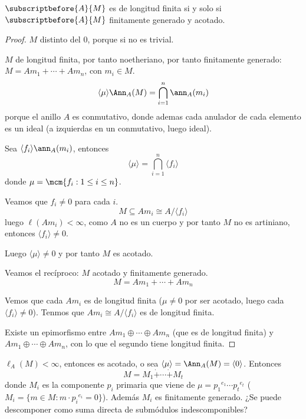 \begin{lema}
  \(\subscriptbefore{A}{M}\) es de longitud finita si y solo si
  \(\subscriptbefore{A}{M}\) finitamente generado y acotado.
\end{lema}
\begin{proof}
  \(M\) distinto del 0, porque si no es trivial.

  \(M\) de longitud finita, por tanto noetheriano, por tanto finitamente
  generado: \(M=Am_1+\cdots+Am_n\), con \(m_i\in M\).
  \[
    \langle\mu\rangle\Ann_A(M)=\bigcap_{i=1}^n\ann_A(m_i)
  \]
  porque el anillo \(A\) es conmutativo, donde ademas cada anulador
  de cada elemento es un ideal (a izquierdas en un conmutativo, luego ideal).

  Sea \(\langle f_i\rangle\ann_A(m_i)\), entonces
  \[
    \langle\mu\rangle=\bigcap_{i=1}^n\langle f_i\rangle
  \]
  donde \(\mu=\mcm\{f_i:1\le i\le n\}\).

  Veamos que \(f_i\neq 0\) para cada \(i\).
  \[
    M\subseteq Am_i\cong A/\langle f_i\rangle
  \]
  luego \(\ell(Am_i)<\infty\), como \(A\) no es un cuerpo y por
  tanto \(M\) no es artiniano, entonces
  \(\langle f_i\rangle\neq0\).

  Luego \(\langle\mu\rangle\neq 0\) y por tanto \(M\) es acotado.

  Veamos el recíproco: \(M\) acotado y finitamente generado.
  \[
    M=Am_1+\cdots+Am_n
  \]

  Vemos que cada \(Am_i\) es de longitud finita (\(\mu\neq 0\) por ser
  acotado, luego cada \(\langle f_i\rangle\neq 0\)).
  Tenmos que \(Am_i\cong A/\langle f_i\rangle\) es de longitud finita.

  Existe un epimorfismo entre \(Am_1\oplus\cdots\oplus Am_n\) (que es
  de longitud finita) y \(Am_1\oplus\cdots\oplus Am_n\), con lo que
  el segundo tiene longitud finita.
\end{proof}

\(\ell_A(M)<\infty\), entonces es acotado, o sea
\(\langle\mu\rangle=\Ann_A(M)=\langle 0\rangle\). Entonces
\[
  M=M_1\dot{+}\cdots\dot{+} M_t
\]
donde \(M_i\) es la componente \(p_i\) primaria que viene de
\(\mu={p_1}^{e_1}\cdots{p_t}^{e_t}\)
(\(M_i=\{m\in M:m\cdot{p_i}^{e_i}=0\}\)).
Además \(M_i\) es finitamente generado.
¿Se puede descomponer como suma directa de submódulos indescomponibles?
